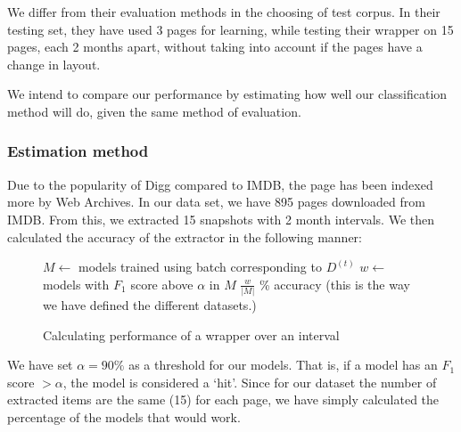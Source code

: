 We differ from their evaluation methods in the choosing of test corpus. In their testing
set, they have used 3 pages for learning, while testing their wrapper on 15 pages,
each 2 months apart, without taking into account if the pages have a change in layout.

	We intend to compare our performance by estimating how well our classification method will do, given the same
method of evaluation.
\subsubsection{Estimation method}
Due to the popularity of Digg compared to IMDB, the page has been indexed more by Web Archives.
In our data set, we have 895 pages downloaded from IMDB. From this, we extracted 15 snapshots
with 2 month intervals. We then calculated the accuracy of the extractor in the following manner:

\begin{figure}[htbp]
\singlespacing
	\begin{algorithm}[H]
	\caption{Calculating performance of a wrapper over an interval}
	\begin{algorithmic}[1]
			\STATE $M \leftarrow$ models trained using batch corresponding to $D^{(t)}$
			\STATE $w \leftarrow$ models with $F_1$ score above $\alpha$ in $M$
			\RETURN $\frac{w}{|M|}$
		\ELSE
			\% accuracy (this is the way we have defined the different datasets.)
		\ENDIF
	\end{algorithmic}
	\end{algorithm}
\label{fig:evalmeth}
\end{figure}

We have set $\alpha = 90\%$ as a threshold for our models. That is, if a model has an $F_1$
score $> \alpha$, the model is considered a `hit'.
Since for our dataset the number of extracted items are the same (15) for each page,
we have simply calculated the percentage of the models that would work.

